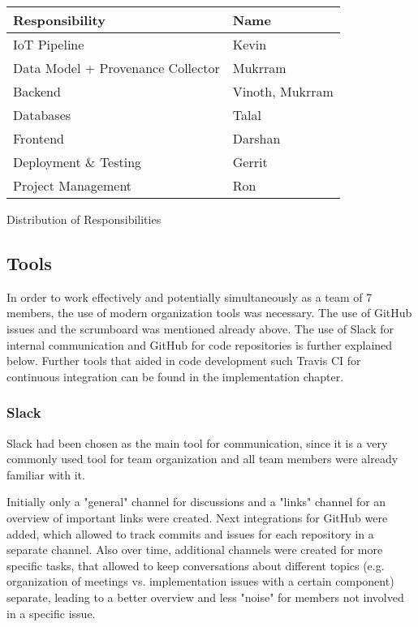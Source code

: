 \renewcommand{\arraystretch}{1.4}
\begin{center}
 \begin{tabular}{| m{18em} m{10em} |} 
 \hline
 Responsibility & Name  \\
 \hline\hline
 IoT Pipeline & Kevin \\ 
 \hline
Data Model + Provenance Collector & Mukrram \\
 \hline
 Backend & Vinoth, Mukrram \\
 \hline
 Databases & Talal \\
 \hline
 Frontend & Darshan \\ 
 \hline
 Deployment \& Testing & Gerrit \\
 \hline
Project Management & Ron \\
 \hline
\end{tabular}
\caption{Distribution of Responsibilities}
\label{table:responsibilities}
\end{center}

\subsection{Tools}

In order to work effectively and potentially simultaneously as a team of 7 members, the use of modern organization tools was necessary. 
The use of GitHub issues and the scrumboard was mentioned already above. 
The use of Slack for internal communication and GitHub for code repositories is further explained below. 
Further tools that aided in code development such Travis CI for continuous integration can be found in the implementation chapter.

\subsubsection{Slack}

Slack had been chosen as the main tool for communication, since it is a very commonly used tool for team organization and all team members were already familiar with it. 

Initially only a "general" channel for discussions and a "links" channel for an overview of important links were created.
Next integrations for GitHub were added, which allowed to track commits and issues for each repository in a separate channel.
Also over time, additional channels were created for more specific tasks, that allowed to keep conversations about different topics (e.g. organization of meetings vs. implementation issues with a certain component) separate, leading to a better overview and less "noise" for members not involved in a specific issue.

